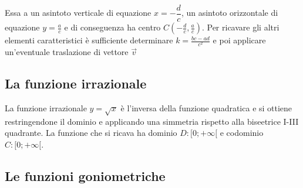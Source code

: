\documentclass{article}     %
\begin{document}
        Essa a un asintoto verticale di equazione $x=-\dfrac{d}{c}$, un asintoto  orizzontale di equazione $y=\frac{a}{c}$ e di conseguenza ha centro $C(-\frac{d}{c},\frac{a}{c})$. Per ricavare gli altri elementi caratteristici è sufficiente determinare $k=\frac{bc-ad}{c^2}$ e poi applicare un'eventuale traslazione di vettore $\vec{v}$
        \subsection{La funzione irrazionale}
        La funzione irrazionale $y=\sqrt{x}$ è l'inversa della funzione quadratica e si ottiene restringendone il dominio e applicando una simmetria rispetto alla biseetrice I-III quadrante. La funzione che si ricava ha dominio $D:[0;+\infty[$ e codominio $C:[0;+\infty[$.
    \subsection{Le funzioni goniometriche}
\end{document}
